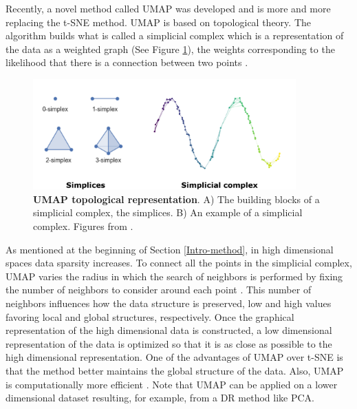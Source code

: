 Recently, a novel method called \gls{UMAP} \cite{McInnes2018} was developed and is more and more replacing the \gls{t-SNE} method. \gls{UMAP} is based on topological theory. The algorithm builds what is called a simplicial complex which is a representation of the data as a weighted graph (See Figure \ref{fig:intro_UMAP_topo}), the weights corresponding to the likelihood that there is a connection between two points \cite{McInnes_doc,AndyCoenen}.  
\begin{figure}[H]
    \centering
    \includegraphics[width=0.9\textwidth]{Figures/Intro/simplicial_complex.pdf}
    \caption[UMAP topological representation]{\textbf{\gls{UMAP} topological representation}. A) The building blocks of a simplicial complex, the simplices. B) An example of a simplicial complex. Figures from \cite{McInnes_doc}.}
    \label{fig:intro_UMAP_topo}
\end{figure}
As mentioned at the beginning of Section \ref{Intro-method}, in high dimensional spaces data sparsity increases. To connect all the points in the simplicial complex, \gls{UMAP} varies the radius in which the search of neighbors is performed by fixing the number of neighbors to consider around each point \cite{McInnes_doc,AndyCoenen}. This number of neighbors influences how the data structure is preserved, low and high values favoring local and global structures, respectively. Once the graphical representation of the high dimensional data is constructed, a low dimensional representation of the data is optimized so that it is as close as possible to the high dimensional representation. %
One of the advantages of \gls{UMAP} over \gls{t-SNE} is that the method better maintains the global structure of the data. Also, \gls{UMAP} is computationally more efficient \cite{McInnes2018}. Note that \gls{UMAP} can be applied on a lower dimensional dataset resulting, for example, from a \gls{DR} method like \gls{PCA}. 


